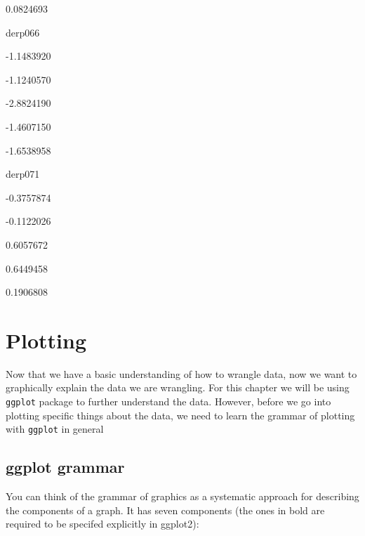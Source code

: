 \documentclass[]{book}
\begin{document}
0.0824693

derp066

-1.1483920

-1.1240570

-2.8824190

-1.4607150

-1.6538958

derp071

-0.3757874

-0.1122026

0.6057672

0.6449458

0.1906808

\chapter{Plotting}\label{plotting}

Now that we have a basic understanding of how to wrangle data, now we
want to graphically explain the data we are wrangling. For this chapter
we will be using \texttt{ggplot} package to further understand the data.
However, before we go into plotting specific things about the data, we
need to learn the grammar of plotting with \texttt{ggplot} in general

\section{ggplot grammar}\label{ggplot-grammar}

You can think of the grammar of graphics as a systematic approach for
describing the components of a graph. It has seven components (the ones
in bold are required to be specifed explicitly in ggplot2):
\end{document}

